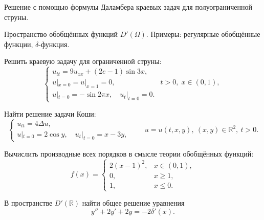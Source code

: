 
\begin{cond}
	Решение с помощью формулы Даламбера краевых задач для полуограниченной струны.
\end{cond}

\begin{cond}
	Пространство обобщённых функций \(D'(\Omega)\). Примеры: регулярные обобщённые функции, \(\delta\)-функция.
\end{cond}

\begin{cond}
	Решить краевую задачу для ограниченной струны:
	\[
		\begin{cases}
			u_{tt} = 9u_{xx} + (2e - 1)\sin 3x,              \\
			u|_{x=0} = u|_{x=1} = 0, & t > 0,\; x \in (0,1), \\
			u|_{t=0} = -\sin 2\pi x,\quad u_t|_{t=0} = 0.
		\end{cases}
	\]
\end{cond}

\begin{cond}
	Найти решение задачи Коши:
	\[
		\begin{cases}
			u_{tt} = 4\Delta u, \\
			u|_{t=0} = 2\cos y,\quad u_t|_{t=0} = x - 3y,
		\end{cases}
		\qquad
		u = u(t,x,y),\ (x,y)\in\mathbb{R}^2,\ t>0.
	\]
\end{cond}

\begin{cond}
	Вычислить производные всех порядков в смысле теории обобщённых функций:
	\[
		f(x) =
		\begin{cases}
			2(x-1)^2, & x \in (0,1), \\
			0,        & x \ge 1,     \\
			1,        & x \le 0.
		\end{cases}
	\]
\end{cond}

\begin{cond}
	В пространстве \(D'(\mathbb{R})\) найти общее решение уравнения
	\[
		y'' + 2y' + 2y = -2\delta'(x).
	\]
\end{cond}
